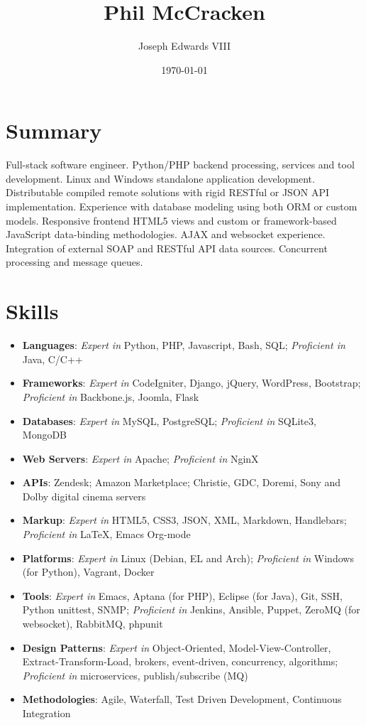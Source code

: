 \documentclass[letterpaper]{article}
\author{Joseph Edwards VIII}
\date{\today}
\title{Phil McCracken}
\begin{document}
\maketitle
{}

\section{Summary}
\label{sec-1}

Full-stack software engineer. Python/PHP backend processing, services and tool development. Linux and Windows standalone application development. Distributable compiled remote solutions with rigid RESTful or JSON API implementation. Experience with database modeling using both ORM or custom models. Responsive frontend HTML5 views and custom or framework-based JavaScript data-binding methodologies. AJAX and websocket experience. Integration of external SOAP and RESTful API data sources. Concurrent processing and message queues.

\section{Skills}
\label{sec-2}

\begin{itemize}
\item \textbf{Languages}: \emph{Expert in} Python, PHP, Javascript, Bash, SQL; \emph{Proficient in} Java, C/C++
\item \textbf{Frameworks}: \emph{Expert in} CodeIgniter, Django, jQuery, WordPress, Bootstrap; \emph{Proficient in} Backbone.js, Joomla, Flask
\item \textbf{Databases}: \emph{Expert in} MySQL, PostgreSQL; \emph{Proficient in} SQLite3, MongoDB
\item \textbf{Web Servers}: \emph{Expert in} Apache; \emph{Proficient in} NginX
\item \textbf{APIs}: Zendesk; Amazon Marketplace; Christie, GDC, Doremi, Sony and Dolby digital cinema servers
\item \textbf{Markup}: \emph{Expert in} HTML5, CSS3, JSON, XML, Markdown, Handlebars; \emph{Proficient in} \LaTeX{}, Emacs Org-mode
\item \textbf{Platforms}: \emph{Expert in} Linux (Debian, EL and Arch); \emph{Proficient in} Windows (for Python), Vagrant, Docker
\item \textbf{Tools}: \emph{Expert in} Emacs, Aptana (for PHP), Eclipse (for Java), Git, SSH, Python unittest, SNMP; \emph{Proficient in} Jenkins, Ansible, Puppet, ZeroMQ (for websocket), RabbitMQ, phpunit
\item \textbf{Design Patterns}: \emph{Expert in} Object-Oriented, Model-View-Controller, Extract-Transform-Load, brokers, event-driven, concurrency, algorithms; \emph{Proficient in} microservices, publish/subscribe (MQ)
\item \textbf{Methodologies}: Agile, Waterfall, Test Driven Development, Continuous Integration
\end{itemize}
\end{document}
